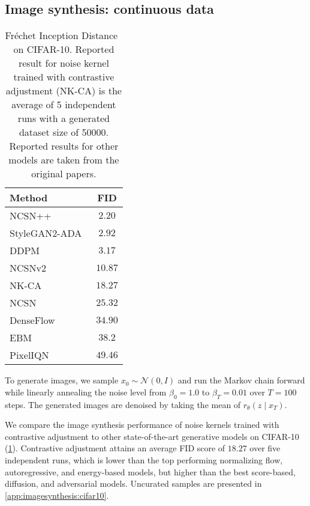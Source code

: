 \documentclass[10pt,twocolumn,letterpaper]{article}
\begin{document}
\subsection{Image synthesis: continuous data}

\begin{table}[t]
  \begin{center}
    \begin{tabular}{lc}
      \toprule
      Method & FID \\
      \midrule
      NCSN++~\cite{song2020score} & $2.20$ \\
      StyleGAN2-ADA~\cite{karras2020training} & $2.92$ \\
      DDPM~\cite{ho2020denoising} & $3.17$ \\
      NCSNv2~\cite{song2020score} & $10.87$ \\
      NK-CA & $18.27$ \\
      NCSN~\cite{song2019generative} & $25.32$ \\
      DenseFlow~\cite{grcic2021densely} & $34.90$ \\
      EBM~\cite{du2019implicit} & $38.2$ \\
      PixelIQN~\cite{ostrovski2018autoregressive} & $49.46$ \\
      \bottomrule
    \end{tabular}
  \end{center}
  \caption{Fréchet Inception Distance~\cite{heusel2017gans} on CIFAR-10.
    Reported result for noise kernel trained with contrastive adjustment (NK-CA) is the average of 5 independent runs with a generated dataset size of \num{50000}.
    Reported results for other models are taken from the original papers.
  }\label{tab:results:cifar}
\end{table}

To generate images, we sample $x_{0}\sim\mathcal{N}(0,I)$ and run the Markov chain forward while linearly annealing the noise level from $\beta_{0}=1.0$ to $\beta_{T}=0.01$ over $T=100$ steps.
The generated images are denoised by taking the mean of $r_{\theta}(z \mid x_{T})$.

We compare the image synthesis performance of noise kernels trained with contrastive adjustment to other state-of-the-art generative models on CIFAR-10 (\cref{tab:results:cifar}).
Contrastive adjustment attains an average FID score of $18.27$ over five independent runs, which is lower than the top performing normalizing flow, autoregressive, and energy-based models, but higher than the best score-based, diffusion, and adversarial models.
Uncurated samples are presented in \cref{app:imagesynthesis:cifar10}.
\end{document}
